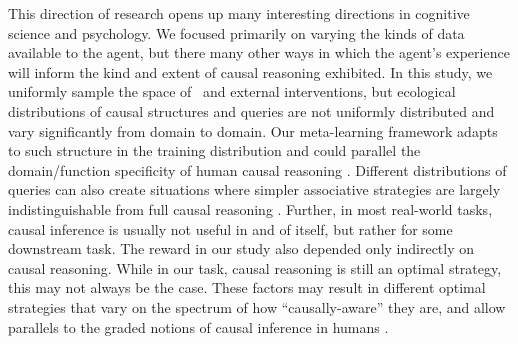 This direction of research opens up many interesting directions in cognitive science and psychology. We focused primarily on varying the kinds of data available to the agent, but there many other ways in which the agent's experience will inform the kind and extent of causal reasoning exhibited. In this study, we uniformly sample the space of \CBNs~and external interventions, but ecological distributions of causal structures and queries are not uniformly distributed and vary significantly from domain to domain. Our meta-learning framework adapts to such structure in the training distribution \citep{duan2016RL2,ortega2019meta,wang2016} and could parallel the domain/function specificity of human causal reasoning \citep{krynski2007role, lombrozo2010causal}. Different distributions of queries can also create situations where simpler associative strategies are largely indistinguishable from full causal reasoning \citep{todd2007environments, gigerenzer2009homo}. 
Further, in most real-world tasks, causal inference is usually not useful in and of itself, but rather for some downstream task. The reward in our study also depended only indirectly on causal reasoning. While in our task, causal reasoning is still an optimal strategy, this may not always be the case. These factors may result in different optimal strategies that vary on the spectrum of how ``causally-aware'' they are, and allow parallels to the graded notions of causal inference in humans \citep{fernbach2010neglect, fernbach2013cognitive, rehder2014independence, rehder2017failures}. 


